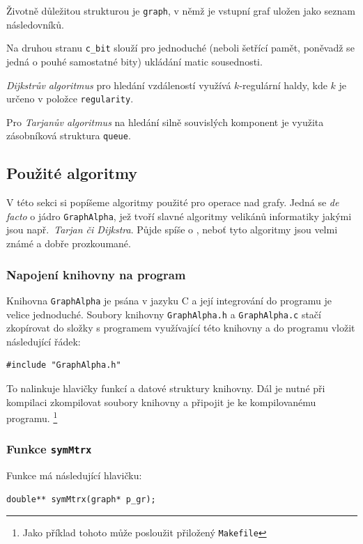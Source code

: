 \documentclass[11pt,a4paper]{article}
\begin{document}
Životně důležitou strukturou je {\tt graph}, v němž je vstupní graf uložen jako
seznam následovníků.

Na druhou stranu {\tt c\_bit} slouží pro jednoduché (neboli šetřící pamět,
poněvadž se jedná o pouhé samostatné bity) ukládání matic sousednosti.

{\sl Dijkstrův algoritmus\/} pro hledání vzdáleností využívá $k$-regulární
haldy, kde $k$ je určeno v položce {\tt regularity}.

Pro {\sl Tarjanův algoritmus\/} na hledání silně souvislých komponent je
využita zásobníková struktura {\tt queue}.

\subsection{Použité algoritmy}
V této sekci si popíšeme algoritmy použité pro operace nad grafy.
Jedná se {\sl de facto\/} o jádro {\tt GraphAlpha}, jež tvoří slavné algoritmy
velikánů informatiky jakými jsou např.\ {\sl Tarjan\/ {\rm či} Dijkstra\/}.
Půjde spíše o , neboť tyto algoritmy jsou velmi známé
a dobře prozkoumané.

\subsubsection{Napojení knihovny na program}
Knihovna {\tt GraphAlpha} je psána v jazyku C a její integrování do programu je
velice jednoduché.
Soubory knihovny {\tt GraphAlpha.h} a {\tt GraphAlpha.c} stačí zkopírovat do
složky s programem využívající této knihovny a do programu vložit následující
řádek:

\begin{verbatim}
#include "GraphAlpha.h"
\end{verbatim}

To nalinkuje hlavičky funkcí a datové struktury knihovny.
Dál je nutné při kompilaci zkompilovat soubory knihovny a připojit je ke
kompilovanému programu.%
\footnote{Jako příklad tohoto může posloužit přiložený \tt Makefile}

\subsubsection{Funkce \tt symMtrx}

Funkce má následující hlavičku:

\begin{verbatim}
double** symMtrx(graph* p_gr);
\end{verbatim}
\end{document}
